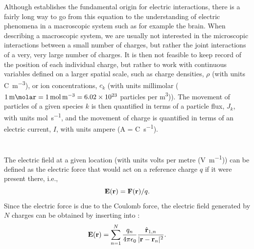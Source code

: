 Although  establishes the fundamental origin for electric interactions, there is a fairly long way to go from this equation to the understanding of electric phenomena in a macroscopic system such as for example the brain. When describing a macroscopic system, we are usually not interested in the microscopic interactions between a small number of charges, but rather the joint interactions of a very, very large number of charges. It is then not feasible to keep record of the position of each individual charge, but rather to work with continuous variables defined on a larger spatial scale, such as charge densities, $\rho$ (with units \si{\coulomb\per\cubic\metre}), or ion concentrations, $c_k$ (with units millimolar ($1\, \si{\milli\molar} = 1 \,\si{\mole\per\cubic\metre} = 6.02\times10^{23}$ particles per \si{\cubic\metre})). The movement of particles of a given species $k$ is then quantified in terms of a particle flux, $J_k$, with units \si{\mole\per\second}, and the movement of charge is quantified in terms of an electric current, $I$, with units ampere (\si{\ampere} = \si{\coulomb\per\second}).


\section{}
\label{sec:Basics:Fields} 
The electric field at a given location (with units volts per metre (\si{\volt\per\metre})) can be defined as the electric force that would act on a reference charge $q$ if it were present there, i.e.,
\begin{equation}
{\bf E}({\bf r}) = {\bf F}({\bf r})/q.
\label{eq:Basics:E}
\end{equation}
Since the electric force is due to the Coulomb force, the electric field generated by $N$ charges can be obtained by inserting  into :
\begin{equation}
{\bf E}({\bf r}) = \sum_{n=1}^{N}  \frac{q_n}{4\pi \epsilon_0} \frac{\hat{{\bf r}}_{1,n}}{|{\bf r}-{\bf r}_n|^2}.
\label{eq:Basics:CoulombEN}
\end{equation}


